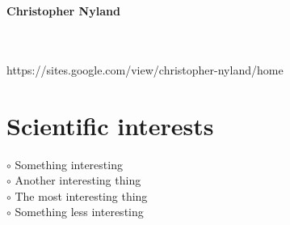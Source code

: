 \documentclass[a4paper,10pt]{article}
\begin{document}
\thispagestyle{empty}

\begin{adjustbox}{valign=t}
\begin{minipage}{0.3\textwidth} %
\begin{center}

\MySkip 	%

{\LARGE \bfseries Christopher Nyland}

\MySkip 	%

\textcolor{ColorTwo}{\faEnvelopeO}
 \\

\textcolor{ColorTwo}{\faChain}
 \\
\textcolor{ColorTwo}{\fontsize{3 pt}{3.6pt}\selectfont https://sites.google.com/view/christopher-nyland/home}
\end{center}

\vfill

\section*{Scientific interests}
\raggedright
\textcolor{ColorOne}{$\circ$} Something interesting\\
\textcolor{ColorOne}{$\circ$} Another interesting thing\\
\textcolor{ColorOne}{$\circ$} The most interesting thing\\
\textcolor{ColorOne}{$\circ$} Something less interesting


\end{minipage}
\end{adjustbox}
\end{document}
